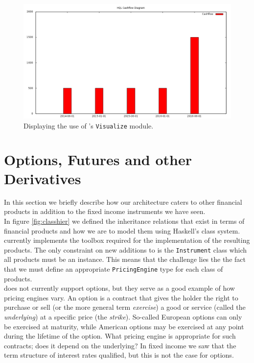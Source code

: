 \begin{figure}[h!]
\begin{center}
\includegraphics[keepaspectratio=true,scale=0.4]{images/GraphicsModuleAwesome.png}
\caption{Displaying the use of \hql's \texttt{Visualize} module.}
\label{fig:awesomeness}
\end{center}
\end{figure}


\section{Options, Futures and other Derivatives}

In this section we briefly describe how our architecture caters to other
financial products in addition to the fixed income instruments we have seen.\\

In figure \ref{fig:classhier} we defined the inheritance relations that
exist in terms of financial products and how we are to model them using 
Haskell's class system. \hql currently implements the toolbox required
for the implementation of the resulting products. The only constraint on
new additions to \hql is the \texttt{Instrument} class which all products
must be an instance. This means that the challenge lies the the fact
that we must define an appropriate \texttt{PricingEngine} type for each
class of products.\\

\hql does not currently support options, but they serve as a good example
of how pricing engines vary. 
An option is a contract that gives the holder the right to purchase or sell
(or the more general term \emph{exercise}) a good or service (called the
\emph{underlying}) at a specific price (the \emph{strike}). So-called European
options can only be exercised at maturity, while American options may be 
exercised at any point during the lifetime of the option.
What pricing engine is appropriate for such contracts; does it depend on the
underlying? In fixed income we saw that the term structure of interest rates
qualified, but this is not the case for options.


